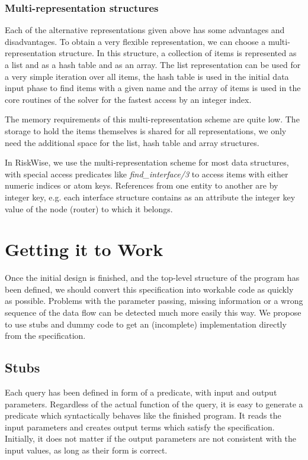 \documentclass[a4paper,12pt]{report}
\begin{document}
\subsection{Multi-representation structures}
Each of the alternative representations given above has some advantages and disadvantages. To obtain a very flexible representation, we can choose a multi-representation structure. In this structure, a collection of items is represented as a list and as a hash table and as an array. The list representation can be used for a very simple iteration over all items, the hash table is used in the initial data input phase to find items with a given name and the array of items is used in the core routines of the solver for the fastest access by an integer index. 

The memory requirements of this multi-representation scheme are quite low. The storage to hold the items themselves is shared for all representations, we only need the additional space for the list, hash table and array structures.

In RiskWise, we use the multi-representation scheme for most data structures, with special access predicates like {\it find\_interface/3} to access items with either numeric indices or atom keys. References from one entity to another are by integer key, e.g. each interface structure contains as an attribute the integer key value of the node (router) to which it belongs.

\chapter{Getting it to Work}
\label{gettingittowork}

Once the initial design is finished, and the top-level structure of the program has been defined, we should convert this specification into workable code as quickly as possible. Problems with the parameter passing, missing information or a wrong sequence of the data flow can be detected much more easily this way. We propose to use stubs and dummy code to get an (incomplete) implementation directly from the specification.

\section{Stubs}
Each query has been defined in form of a predicate, with input and output parameters. Regardless of the actual function of the query, it is easy to generate a predicate which syntactically behaves like the finished program. It reads the input parameters and creates output terms which satisfy the specification. Initially, it does not matter if the output parameters are not consistent with the input values, as long as their form is correct.
\end{document}
